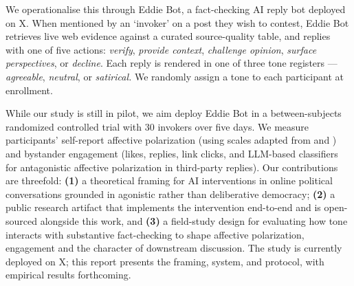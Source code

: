We operationalise this through Eddie Bot, a fact-checking AI reply bot deployed on X. When mentioned by an `invoker' on a post they wish to contest, Eddie Bot retrieves live web evidence against a curated source-quality table, and replies with one of five actions: \textit{verify}, \textit{provide context}, \textit{challenge opinion}, \textit{surface perspectives}, or \textit{decline}. Each reply is rendered in one of three tone registers — \textit{agreeable}, \textit{neutral}, or \textit{satirical.} We randomly assign a tone to each participant at enrollment. 

While our study is still in pilot, we aim deploy Eddie Bot in a between-subjects randomized controlled trial with 30 invokers over five days. We measure participants' self-report affective polarization (using scales adapted from \citet{Strayetal2026ProsocialRrankingChallenge} and \citet{Westphal2024AffectivePolarization}) and bystander engagement (likes, replies, link clicks, and LLM-based classifiers for antagonistic affective polarization in third-party replies). Our contributions are threefold: \textbf{(1)} a theoretical framing for AI interventions in online political conversations grounded in agonistic rather than deliberative democracy; \textbf{(2)} a public research artifact that implements the intervention end-to-end and is open-sourced alongside this work, and \textbf{(3)} a field-study design for evaluating how tone interacts with substantive fact-checking to shape affective polarization, engagement and the character of downstream discussion. The study is currently deployed on X; this report presents the framing, system, and protocol, with empirical results forthcoming.